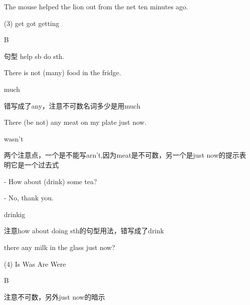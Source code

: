\begin{question}[tags={xiaoxuect}]
The mouse helped the lion \blank[width=1cm]{} out from the net ten minutes ago.

  \begin{tasks}(3)
    \task get
    \task got
    \task getting
  \end{tasks}

\end{question}
\begin{solution}
B

句型 help sb do sth.
\end{solution}

\begin{question}[tags={xiaoxuect}]
There is not \blank[width=1cm]{}(many) food in the fridge.
\end{question}
\begin{solution}
much

错写成了any，注意不可数名词多少是用much
\end{solution}

\begin{question}[tags={xiaoxuect}]
There \blank[width=1cm]{}(be not) any meat on my plate just now.
\end{question}
\begin{solution}
wasn't

两个注意点，一个是不能写arn't,因为meat是不可数，另一个是just now的提示表明它是一个过去式
\end{solution}

\begin{question}[tags={xiaoxuect}]
- How about \blank[width=1cm]{}(drink) some tea?

\noindent - No, thank you.
\end{question}
\begin{solution}
drinkig

注意how about doing sth的句型用法，错写成了drink
\end{solution}

\begin{question}[tags={xiaoxuect}]
\blank*[width=1cm]{} there any milk in the glass just now?

  \begin{tasks}(4)
    \task Is
    \task Was
    \task Are
    \task Were
  \end{tasks}

\end{question}
\begin{solution}
B

注意不可数，另外just now的暗示
\end{solution}


